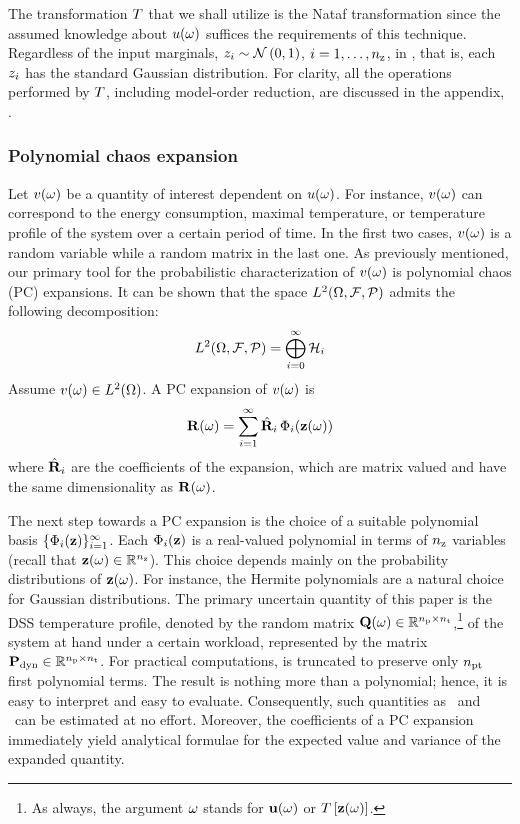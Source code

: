 The transformation $\oTransform$ that we shall utilize is the Nataf transformation \cite{li2008} since the assumed knowledge about $u(\omega)$ suffices the requirements of this technique.
Regardless of the input marginals, $z_i \sim \mathcal{N}\left( 0, 1 \right)$, $i = 1, \dots, {n_\text{z}}$, in , that is, each $z_i$ has the standard Gaussian distribution.
For clarity, all the operations performed by $\oTransform$, including model-order reduction, are discussed in the appendix, .

\subsubsection{Polynomial chaos expansion}
Let $v(\omega)$ be a quantity of interest dependent on $u(\omega)$.
For instance, $v(\omega)$ can correspond to the energy consumption, maximal temperature, or temperature profile of the system over a certain period of time.
In the first two cases, $v(\omega)$ is a random variable while a random matrix in the last one.
As previously mentioned, our primary tool for the probabilistic characterization of $v(\omega)$ is polynomial chaos (PC) expansions.
It can be shown that the space $L^{2}(\Omega, \mathcal{F}, \mathcal{P})$ admits the following decomposition:
\[
  L^{2}(\Omega, \mathcal{F}, \mathcal{P}) = \bigoplus_{i = 0}^\infty \mathcal{H}_i
\]
Assume $v(\omega) \in L^{2}(\Omega)$.
A PC expansion of $v(\omega)$ is
\begin{equation} \elab{polynomial-chaos-expansion}
  \mR(\o) = \sum_{i = 1}^\infty \pcc{\mR}_i \, \pcb_i(\vZ(\o))
\end{equation}
where $\hat{\mathbf{R}}_i$ are the coefficients of the expansion, which are matrix valued and have the same dimensionality as $\mathbf{R}(\omega)$.

The next step towards a PC expansion is the choice of a suitable polynomial basis $\{ \Phi_i(\mathbf{z}) \}_{i = 1}^\infty$.
Each $\Phi_i(\mathbf{z})$ is a real-valued polynomial in terms of ${n_\text{z}}$ variables (recall that $\mathbf{z}(\omega) \in \mathbb{R}^{n_\text{z}}$).
This choice depends mainly on the probability distributions of $\mathbf{z}(\omega)$.
For instance, the Hermite polynomials are a natural choice for Gaussian distributions.
The primary uncertain quantity of this paper is the DSS temperature profile, denoted by the random matrix $\mathbf{Q}(\omega) \in \mathbb{R}^{{n_\text{p}} \times {n_\text{t}}}$,\footnote{As always, the argument $\omega$ stands for $\mathbf{u}(\omega)$ or $\oTransform{\vZ(\o)}$.} of the system at hand under a certain workload, represented by the matrix $\mathbf{P}_{\text{dyn}} \in \mathbb{R}^{{n_\text{p}} \times {n_\text{t}}}$.
For practical computations,  is truncated to preserve only ${n_\text{pt}}$ first polynomial terms.
The result is nothing more than a polynomial; hence, it is easy to interpret and easy to evaluate.
Consequently, such quantities as \cdfs\ and \pdfs\ can be estimated at no effort.
Moreover, the coefficients of a PC expansion immediately yield analytical formulae for the expected value and variance of the expanded quantity.

